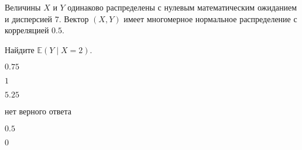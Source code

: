 
\begin{question}
Величины \(X\) и \(Y\) одинаково распределены с нулевым математическим
ожиданием и дисперсией \(7\). Вектор \((X, Y)\) имеет многомерное
нормальное распределение с корреляцией \(0.5\).

Найдите \(\mathbb{E}(Y\mid X = 2)\).
\begin{answerlist}
  \item \(0.75\)
  \item \(1\)
  \item \(5.25\)
  \item нет верного ответа
  \item \(0.5\)
  \item \(0\)
\end{answerlist}
\end{question}


